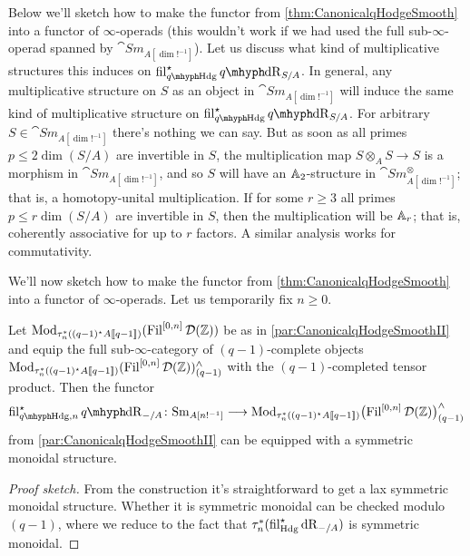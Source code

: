 \documentclass[DIV=12,numbers=enddot,leqno,bibliography=totoc]{scrartcl}
\begin{document}
\begin{numpar}[Monoidality.]
		Below we'll sketch how to make the functor from \cref{thm:CanonicalqHodgeSmooth} into a functor of $\infty$-operads (this wouldn't work if we had used the full sub-$\infty$-operad spanned by $\cat{Sm}_{A[\dim!^{-1}]}$). Let us discuss what kind of multiplicative structures this induces on $\fil_{\qHodge}^\star\qdeRham_{S/A}$. In general, any multiplicative structure on $S$ as an object in $\cat{Sm}_{A[\dim!^{-1}]}$ will induce the same kind of multiplicative structure on $\fil_{\qHodge}^\star\qdeRham_{S/A}$. For arbitrary $S\in \cat{Sm}_{A[\dim!^{-1}]}$ there's nothing we can say. But as soon as all primes $p\leqslant 2\dim(S/A)$ are invertible in $S$, the multiplication map $S\otimes_A S\rightarrow S$ is a morphism in $\cat{Sm}_{A[\dim!^{-1}]}$, and so $S$ will have an $\mathbb{A}_2$-structure in $\cat{Sm}_{A[\dim!^{-1}]}^\otimes$; that is, a homotopy-unital multiplication. If for some $r\geqslant 3$ all primes $p\leqslant r\dim(S/A)$ are invertible in $S$, then the multiplication will be $\mathbb{A}_r$; that is,  coherently associative for up to $r$ factors. A similar analysis works for commutativity.
	\end{numpar}
	We'll now sketch how to make the functor from \cref{thm:CanonicalqHodgeSmooth} into a functor of $\infty$-operads. Let us temporarily fix $n\geqslant 0$.
	
	\begin{lem}\label{lem:Truncatedq-1Completion}
		Let $\operatorname{Mod}_{\tau_n^*((q-1)^\star A\llbracket q-1\rrbracket)}(\operatorname{Fil}^{[0,n]}\mathcal{D}(\mathbb{Z}))$ be as in \cref{par:CanonicalqHodgeSmoothII} and equip the full sub-$\infty$-category of $(q-1)$-complete objects $\operatorname{Mod}_{\tau_n^*((q-1)^\star A\llbracket q-1\rrbracket)}(\operatorname{Fil}^{[0,n]}\mathcal{D}(\mathbb{Z}))_{(q-1)}^\wedge$ with the $(q-1)$-completed tensor product. Then the functor
		\begin{equation*}
			\fil_{\qHodge,n}^\star\qdeRham_{-/A}\colon \cat{Sm}_{A[n!^{-1}]}\longrightarrow \Mod_{\tau_n^*((q-1)^\star A\qpower)}\bigl(\Fil^{[0,n]}\Dd(\IZ)\bigr)_{(q-1)}^\complete
		\end{equation*}
		from \cref{par:CanonicalqHodgeSmoothII} can be equipped with a symmetric monoidal structure.
	\end{lem}
	\begin{proof}[Proof sketch]
		From the construction it's straightforward to get a lax symmetric monoidal structure. Whether it is symmetric monoidal can be checked modulo~$(q-1)$, where we reduce to the fact that $\tau_n^*(\operatorname{fil}_{\mathrm{Hdg}}^\star\mathrm{dR}_{-/A})$ is symmetric monoidal.
	\end{proof}
	
\end{document}
